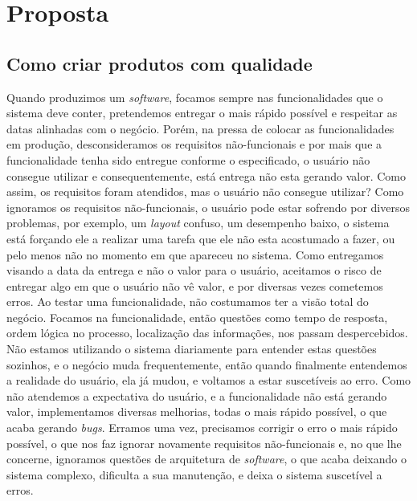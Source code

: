 \chapter{Proposta}
  \section{Como criar produtos com qualidade}
    Quando produzimos um \textit{software}, focamos sempre nas funcionalidades que
    o sistema deve conter, pretendemos entregar o mais rápido possível e respeitar
    as datas alinhadas com o negócio. Porém, na pressa de colocar as funcionalidades
    em produção, desconsideramos os requisitos não-funcionais e por mais que a
    funcionalidade tenha sido entregue conforme o especificado, o usuário não
    consegue utilizar e consequentemente, está entrega não esta gerando valor. \newline
    Como assim, os requisitos foram atendidos, mas o usuário não consegue utilizar?
    Como ignoramos os requisitos não-funcionais, o usuário pode estar sofrendo por
    diversos problemas, por exemplo, um \textit{layout} confuso, um desempenho baixo,
    o sistema está forçando ele a realizar uma tarefa que ele não esta acostumado a
    fazer, ou pelo menos não no momento em que apareceu no sistema. Como entregamos
    visando a data da entrega e não o valor para o usuário, aceitamos o risco de
    entregar algo em que o usuário não vê valor, e por diversas vezes cometemos
    erros. Ao testar uma funcionalidade, não costumamos ter a visão total do negócio.
    Focamos na funcionalidade, então questões como tempo de resposta, ordem lógica
    no processo, localização das informações, nos passam despercebidos. Não estamos
    utilizando o sistema diariamente para entender estas questões sozinhos, e o
    negócio muda frequentemente, então quando finalmente entendemos a realidade do
    usuário, ela já mudou, e voltamos a estar suscetíveis ao erro. \newline
    Como não atendemos a expectativa do usuário, e a funcionalidade não está gerando
    valor, implementamos diversas melhorias, todas o mais rápido possível, o que
    acaba gerando \textit{bugs}. Erramos uma vez, precisamos corrigir o erro o mais
    rápido possível, o que nos faz ignorar novamente requisitos não-funcionais e,
    no que lhe concerne, ignoramos questões de arquitetura de \textit{software},
    o que acaba deixando o sistema complexo, dificulta a sua manutenção, e deixa
    o sistema suscetível a erros. \newline
